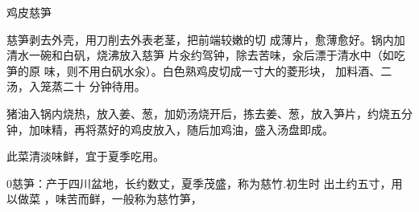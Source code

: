 \begin{recipe}{鸡皮慈笋}

\ingredients


\cooking

\step 慈笋剥去外壳，用刀削去外表老茎，把前端较嫩的切 成薄片，愈薄愈好。锅内加
清水一碗和白矾，烧沸放入慈笋 片汆约驾钟，除去苦味，汆后漂于清水中（如吃笋的原
味，则不用白矾水汆）。白色熟鸡皮切成一寸大的菱形块， 加料酒、二汤，入笼蒸二十
分钟待用。

\step 猪油入锅内烧热，放入姜、葱，加奶汤烧开后，拣去姜、葱，放入笋片，约烧五分
钟，加味精，再将蒸好的鸡皮放入，随后加鸡油，盛入汤盘即成。

\features

此菜清淡味鲜，宜于夏季吃用。

0慈笋：产于四川盆地，长约数丈，夏季茂盛，称为慈竹.初生时 出土约五寸，用以做菜
，味苦而鲜，一般称为慈竹笋，

\end{recipe}


